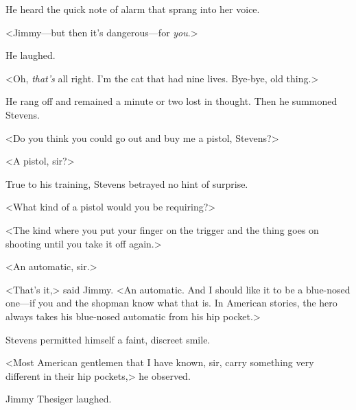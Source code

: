 He heard the quick note of alarm that sprang into her voice.

<Jimmy—but then it's dangerous—for \emph{you}.>

He laughed.

<Oh, \emph{that's} all right. I'm the cat that had nine lives. Bye-bye, old thing.>

He rang off and remained a minute or two lost in thought. Then he summoned Stevens.

<Do you think you could go out and buy me a pistol, Stevens?>

<A pistol, sir?>

True to his training, Stevens betrayed no hint of surprise.

<What kind of a pistol would you be requiring?>

<The kind where you put your finger on the trigger and the thing goes on shooting until you take it off again.>

<An automatic, sir.>

<That's it,> said Jimmy. <An automatic. And I should like it to be a blue-nosed one—if you and the shopman know what that is. In American stories, the hero always takes his blue-nosed automatic from his hip pocket.>

Stevens permitted himself a faint, discreet smile.

<Most American gentlemen that I have known, sir, carry something very different in their hip pockets,> he observed.

Jimmy Thesiger laughed.